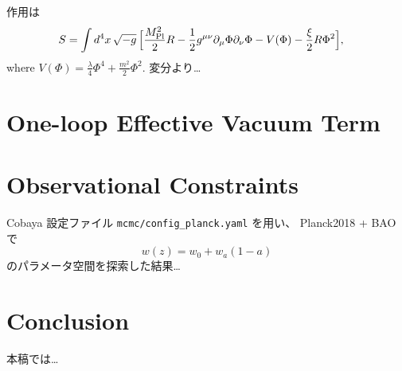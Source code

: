 \documentclass[11pt,a4paper]{article}
\newcommand{\Mpl}{M_{\mathrm{Pl}}}   %
\begin{document}
作用は
\begin{align}
  S &= \int d^4x \,\sqrt{-g}\,\Bigl[
        \frac{\Mpl^{2}}{2} R
      - \frac12 g^{\mu\nu}\partial_\mu \Phi \partial_\nu \Phi
      - V(\Phi)
      - \frac{\xi}{2} R \Phi^2
    \Bigr], \label{eq:action}
\end{align}
where $V(\Phi)=\frac{\lambda}{4}\Phi^4 + \frac{m^2}{2}\Phi^2$.
変分より…

\section{One-loop Effective Vacuum Term}
\label{sec:loop}


\section{Observational Constraints}
\label{sec:mcmc}

Cobaya 設定ファイル \texttt{mcmc/config\_planck.yaml} を用い、
Planck2018 + BAO で
\[
  w(z) = w_0 + w_a (1-a)
\]
のパラメータ空間を探索した結果…

\section{Conclusion}
本稿では…


% 
\end{document}
